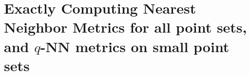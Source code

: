 \section{Exactly Computing Nearest Neighbor Metrics for all point sets, and $q$-NN metrics on
small point sets}\label{sec:metric-equality}









